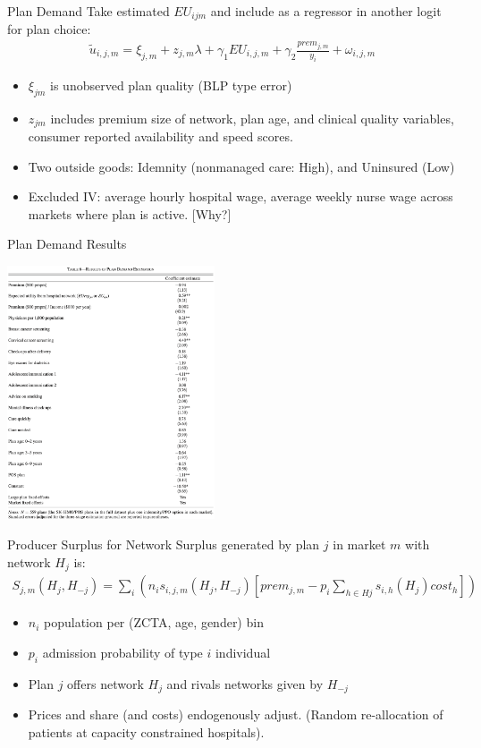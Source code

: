 \documentclass[xcolor=pdftex,dvipsnames,table,mathserif,aspectratio=169]{beamer}
\begin{document}
\begin{frame}{Plan Demand}
Take estimated $EU_{ijm}$ and include as a regressor in another logit for plan choice:
\begin{align*}
\tilde{u}_{i, j, m}=\xi_{j, m}+z_{j, m} \lambda+\gamma_{1} E U_{i, j, m}+\gamma_{2} \frac{ prem_{j, m}}{y_{i}}+\omega_{i, j, m}
\end{align*}
\begin{itemize}
\item $\xi_{jm}$ is unobserved plan quality (BLP type error)
\item $z_{jm}$ includes premium size of network, plan age, and clinical quality variables, consumer reported availability and speed scores.
\item Two outside goods: Idemnity (nonmanaged care: High), and Uninsured (Low)
\item Excluded IV: average hourly hospital wage, average weekly nurse wage across markets where plan is active. [Why?]
\end{itemize}
\end{frame}

\begin{frame}{Plan Demand Results}
\begin{center}
\includegraphics[height=7.5cm]{./resources/ho_table6.png}
\end{center}
\end{frame}

\begin{frame}{Producer Surplus for Network}
Surplus generated by plan $j$ in market $m$ with network $H_j$ is:
\begin{align*}
S_{j, m}\left(H_{j}, H_{-j}\right)=\sum_{i}\left(n_{i} s_{i, j, m}\left(H_{j}, H_{-j}\right)\left[prem_{j, m}-p_{i} \sum_{h \in H j} s_{i, h}\left(H_{j}\right)  cost_{h}\right]\right)
\end{align*}
\begin{itemize}
\item $n_i$ population per (ZCTA, age, gender) bin
\item $p_i$ admission probability of type $i$ individual
\item Plan $j$ offers network $H_j$ and rivals networks given by $H_{-j}$
 \item Prices and share (and costs) endogenously adjust. (Random re-allocation of patients at capacity constrained hospitals).
\end{itemize}
\end{frame}
\end{document}
